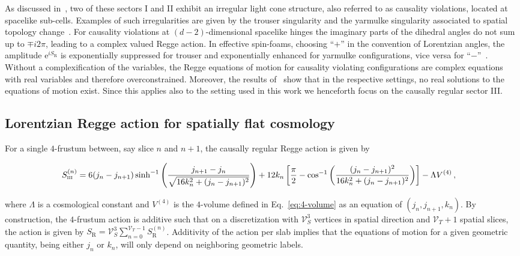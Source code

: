 \documentclass[amsmath,amssymb,aps,twocolumn,superscriptaddress,nofootinbib]{revtex4-1}
\newcommand{\e}{\mathrm{e}}
\newcommand{\Sreg}{S_{\mathrm{R}}}
\begin{document}
As discussed in~\cite{Dittrich:2021gww,Dittrich:2023rcr,Jercher:2023csk,Jercher:2024kig,Jercher:2024hlr}, two of these sectors I and II exhibit an irregular light cone structure, also referred to as causality violations, located at spacelike sub-cells.
Examples of such irregularities are given by the trouser singularity and the yarmulke singularity associated to spatial topology change~\cite{Horowitz:1990qb,Louko:1995jw,Dowker:1999wu}. 
For causality violations at $(d-2)$-dimensional spacelike hinges the imaginary parts of the dihedral angles do not sum up to $\mp i2\pi$, leading to a complex valued Regge action.
In effective spin-foams, choosing \enquote{$+$} in the convention of Lorentzian angles, the amplitude $\e^{i\Sreg}$ is exponentially suppressed for trouser and exponentially enhanced for yarmulke configurations, vice versa for \enquote{$-$}~\cite{Asante:2021zzh}.%
Without a complexification of the variables, the Regge equations of motion for causality violating configurations are complex equations with real variables and therefore overconstrained.
Moreover, the results of~\cite{Jercher:2023csk,Dittrich:2021gww} show that in the respective settings, no real solutions to the equations of motion exist.
Since this applies also to the setting used in this work we henceforth focus on the causally regular sector III.

\subsection{Lorentzian Regge action for spatially flat cosmology}\label{sec:Lorentzian Regge action for spatially flat cosmology}

For a single $4$-frustum between, say slice $n$ and $n+1$, the causally regular Regge action is given by
%
\begin{widetext}
\begin{equation}\label{eq:regular Regge action}
\begin{aligned}
S_{\textsc{iii}}^{(n)} & = 6(j_n-j_{n+1})\sinh^{-1}\left(\frac{j_{n+1}-j_n}{\sqrt{16k_n^2+(j_n-j_{n+1})^2}}\right) + 12k_n\left[\frac{\pi}{2}-\cos^{-1}\left(\frac{(j_n-j_{n+1})^2}{16k_n^2+(j_n-j_{n+1})^2}\right)\right] - \Lambda V^{(4)}\,,
\end{aligned}
\end{equation}  
\end{widetext}
%
where $\Lambda$ is a cosmological constant and $V^{(4)}$ is the $4$-volume defined in Eq.~\eqref{eq:4-volume} as an equation of $(j_n,j_{n+1},k_n)$.
By construction, the $4$-frustum action is additive such that on a discretization with $\mathcal{V}_S^3$ vertices in spatial direction and $\mathcal{V}_T+1$ spatial slices, the action is given by $S_{\mathrm{R}} = \mathcal{V}_S^3\sum_{n=0}^{\mathcal{V}_T-1}S_{\mathrm{R}}^{(n)}$.
Additivity of the action per slab implies that the equations of motion for a given geometric quantity, being either $j_n$ or $k_n$, will only depend on neighboring geometric labels.
\end{document}
